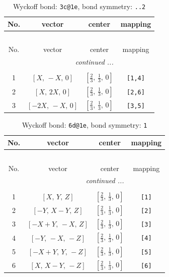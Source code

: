 \documentclass[fleqn,8pt]{jsarticle}
\begin{document}
\begin{longtable}{cccc}
\caption{Wyckoff bond: {\tt 3c@1e}, bond symmetry: {\tt ..2}}
 \\
 \hline \hline
No. & vector & center & mapping \\ \hline \endfirsthead

\multicolumn{3}{l}{\tablename\ \thetable{}} \\
 \hline \hline
No. & vector & center & mapping \\ \hline \endhead

 \hline \hline
\multicolumn{3}{r}{\footnotesize\it continued ...} \\ \endfoot

 \hline \hline
\multicolumn{3}{r}{} \\ \endlastfoot

1 & $\left[ X,\, - X,\, 0 \right]$ & $\left[ \frac{2}{3},\, \frac{1}{3},\, 0 \right]$ & {\tt [1,4]} \\ \hline
2 & $\left[ X,\, 2 X,\, 0 \right]$ & $\left[ \frac{2}{3},\, \frac{1}{3},\, 0 \right]$ & {\tt [2,6]} \\ \hline
3 & $\left[ - 2 X,\, - X,\, 0 \right]$ & $\left[ \frac{2}{3},\, \frac{1}{3},\, 0 \right]$ & {\tt [3,5]} \\
\end{longtable}
\renewcommand{\arraystretch}{1.2}
\begin{longtable}{cccc}
\caption{Wyckoff bond: {\tt 6d@1e}, bond symmetry: {\tt 1}}
 \\
 \hline \hline
No. & vector & center & mapping \\ \hline \endfirsthead

\multicolumn{3}{l}{\tablename\ \thetable{}} \\
 \hline \hline
No. & vector & center & mapping \\ \hline \endhead

 \hline \hline
\multicolumn{3}{r}{\footnotesize\it continued ...} \\ \endfoot

 \hline \hline
\multicolumn{3}{r}{} \\ \endlastfoot

1 & $\left[ X,\, Y,\, Z \right]$ & $\left[ \frac{2}{3},\, \frac{1}{3},\, 0 \right]$ & {\tt [1]} \\ \hline
2 & $\left[ - Y,\, X - Y,\, Z \right]$ & $\left[ \frac{2}{3},\, \frac{1}{3},\, 0 \right]$ & {\tt [2]} \\ \hline
3 & $\left[ - X + Y,\, - X,\, Z \right]$ & $\left[ \frac{2}{3},\, \frac{1}{3},\, 0 \right]$ & {\tt [3]} \\ \hline
4 & $\left[ - Y,\, - X,\, - Z \right]$ & $\left[ \frac{2}{3},\, \frac{1}{3},\, 0 \right]$ & {\tt [4]} \\ \hline
5 & $\left[ - X + Y,\, Y,\, - Z \right]$ & $\left[ \frac{2}{3},\, \frac{1}{3},\, 0 \right]$ & {\tt [5]} \\ \hline
6 & $\left[ X,\, X - Y,\, - Z \right]$ & $\left[ \frac{2}{3},\, \frac{1}{3},\, 0 \right]$ & {\tt [6]} \\
\end{longtable}
\end{document}
